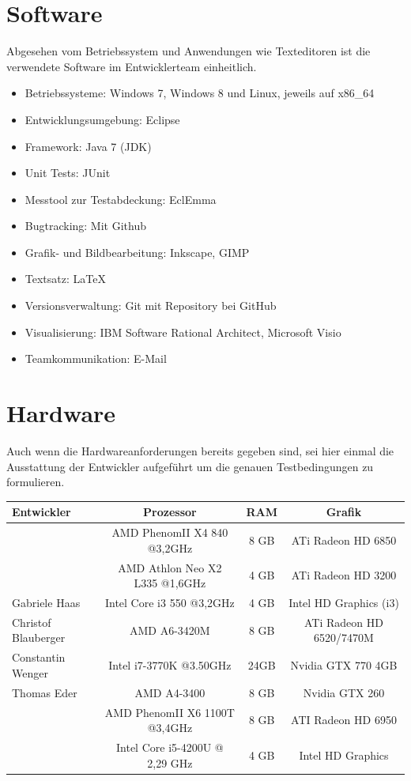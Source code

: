 \documentclass[10pt]{scrreprt}
\begin{document}
\section{Software}
Abgesehen vom Betriebssystem und Anwendungen wie Texteditoren ist die verwendete Software im Entwicklerteam einheitlich.
\begin{itemize}
\item Betriebssysteme: Windows 7, Windows 8 und Linux, jeweils auf x86{\_}64
\item Entwicklungsumgebung: Eclipse
\item Framework: Java 7 (JDK)
\item Unit Tests: JUnit
\item Messtool zur Testabdeckung: EclEmma
\item Bugtracking: Mit Github
\item Grafik- und Bildbearbeitung: Inkscape, GIMP
\item Textsatz: \LaTeX
\item Versionsverwaltung: Git mit Repository bei GitHub
\item Visualisierung: IBM Software Rational Architect, Microsoft Visio
\item Teamkommunikation: E-Mail
\end{itemize}

\vspace{5mm}
\section{Hardware}
Auch wenn die Hardwareanforderungen bereits gegeben sind, sei hier einmal die Ausstattung der Entwickler aufgeführt um die genauen Testbedingungen zu formulieren.

\vspace{0.5cm}

\begin{tabular}{|l|c|c|c|}
\hline
\rule[-1ex]{0pt}{4ex}\textsf{\textbf{Entwickler}} & \textsf{\textbf{Prozessor}} & \textsf{\textbf{RAM}} & \textsf{\textbf{Grafik}} \\
\hline
\hline
\rule[-1ex]{0pt}{4ex}\multirow{2}{*}{Fabian Knorr} & AMD PhenomII X4 840 @3,2GHz & 8 GB & ATi Radeon HD 6850 \\
\rule[-1ex]{0pt}{2ex} & AMD Athlon Neo X2 L335 @1,6GHz & 4 GB & ATi Radeon HD 3200 \\
\hline
\rule[-1ex]{0pt}{4ex}Gabriele Haas & Intel Core i3 550 @3,2GHz & 4 GB & Intel HD Graphics (i3) \\
\hline
\rule[-1ex]{0pt}{4ex}Christof Blauberger & AMD A6-3420M & 8 GB & ATi Radeon HD 6520/7470M \\
\hline
\rule[-1ex]{0pt}{4ex}Constantin Wenger & Intel i7-3770K @3.50GHz & 24GB & Nvidia GTX 770 4GB \\
\hline
\rule[-1ex]{0pt}{4ex}Thomas Eder & AMD A4-3400 & 8 GB & Nvidia GTX 260 \\
\hline
\rule[-1ex]{0pt}{4ex}\multirow{2}{*}{Sebastian Reichl} & AMD PhenomII X6 1100T @3,4GHz & 8 GB & ATI Radeon HD 6950 \\
\rule[-1ex]{0pt}{2ex}& Intel Core i5-4200U @ 2,29 GHz & 4 GB & Intel HD Graphics \\
\hline
\end{tabular}
\end{document}
